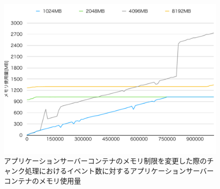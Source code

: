 \documentclass[../../../../../main]{subfiles}
\begin{document}
    \begin{figure}[H]
        \centering
        \includegraphics[width=12cm]{graph}
        \caption{アプリケーションサーバーコンテナのメモリ制限を変更した際のチャンク処理におけるイベント数に対するアプリケーションサーバーコンテナのメモリ使用量}
        \label{fig:stream-change-app-memory-limit-app-memory-app_4_db_1_1024}
    \end{figure}
\end{document}
